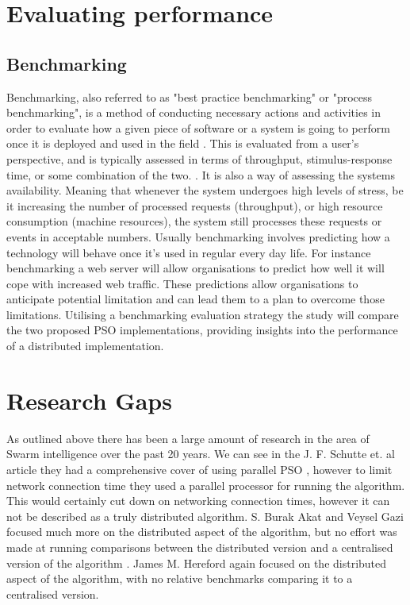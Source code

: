 \documentclass[oneside,12pt]{book}
\begin{document}
\section{Evaluating performance}
\subsection{Benchmarking}
Benchmarking, also referred to as "best practice benchmarking" or "process benchmarking", is a method of conducting necessary actions and activities in order to evaluate how a given piece of software or a system is going to perform once it is deployed and used in the field \cite{jetmarova2011comparison}. This is evaluated from a user’s perspective, and is typically assessed in terms of throughput, stimulus-response time, or some combination of the two. \cite{vokolos1998performance}. It is also a way of assessing the systems availability. Meaning that whenever the system undergoes high levels of stress, be it increasing the number of processed requests (throughput), or high resource consumption (machine resources), the system still processes these requests or events in acceptable numbers\cite{vokolos1998performance}. Usually benchmarking involves predicting how a technology will behave once it's used in regular every day life. For instance benchmarking a web server will allow organisations to predict how well it will cope with increased web traffic. These predictions allow organisations to anticipate potential limitation and can lead them to a plan to overcome those limitations. Utilising a benchmarking evaluation strategy the study will compare the two proposed PSO implementations, providing insights into the performance of a distributed implementation. 
 
\section{Research Gaps}
As outlined above there has been a large amount of research in the area of Swarm intelligence over the past 20 years. We can see in the J. F. Schutte et. al article they had a comprehensive cover of using parallel PSO \cite{schutte2004parallel}, however to limit network connection time they used a parallel processor for running the algorithm. This would certainly cut down on networking connection times, however it can not be described as a truly distributed algorithm. S. Burak Akat and Veysel Gazi focused much more on the distributed aspect of the algorithm, but no effort was made at running comparisons between the distributed version and a centralised version of the algorithm \cite{akat_gazi_2008}. James M. Hereford again focused on the distributed aspect of the algorithm, with no relative benchmarks comparing it to a centralised version. \cite{hereford_2006}
\end{document}
